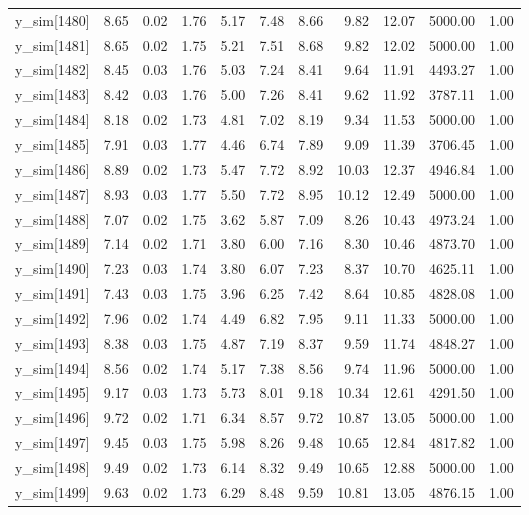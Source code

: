 \begin{table}[ht]
\begin{tabular}{rrrrrrrrrrr}
  y\_sim[1480] & 8.65 & 0.02 & 1.76 & 5.17 & 7.48 & 8.66 & 9.82 & 12.07 & 5000.00 & 1.00 \\ 
  y\_sim[1481] & 8.65 & 0.02 & 1.75 & 5.21 & 7.51 & 8.68 & 9.82 & 12.02 & 5000.00 & 1.00 \\ 
  y\_sim[1482] & 8.45 & 0.03 & 1.76 & 5.03 & 7.24 & 8.41 & 9.64 & 11.91 & 4493.27 & 1.00 \\ 
  y\_sim[1483] & 8.42 & 0.03 & 1.76 & 5.00 & 7.26 & 8.41 & 9.62 & 11.92 & 3787.11 & 1.00 \\ 
  y\_sim[1484] & 8.18 & 0.02 & 1.73 & 4.81 & 7.02 & 8.19 & 9.34 & 11.53 & 5000.00 & 1.00 \\ 
  y\_sim[1485] & 7.91 & 0.03 & 1.77 & 4.46 & 6.74 & 7.89 & 9.09 & 11.39 & 3706.45 & 1.00 \\ 
  y\_sim[1486] & 8.89 & 0.02 & 1.73 & 5.47 & 7.72 & 8.92 & 10.03 & 12.37 & 4946.84 & 1.00 \\ 
  y\_sim[1487] & 8.93 & 0.03 & 1.77 & 5.50 & 7.72 & 8.95 & 10.12 & 12.49 & 5000.00 & 1.00 \\ 
  y\_sim[1488] & 7.07 & 0.02 & 1.75 & 3.62 & 5.87 & 7.09 & 8.26 & 10.43 & 4973.24 & 1.00 \\ 
  y\_sim[1489] & 7.14 & 0.02 & 1.71 & 3.80 & 6.00 & 7.16 & 8.30 & 10.46 & 4873.70 & 1.00 \\ 
  y\_sim[1490] & 7.23 & 0.03 & 1.74 & 3.80 & 6.07 & 7.23 & 8.37 & 10.70 & 4625.11 & 1.00 \\ 
  y\_sim[1491] & 7.43 & 0.03 & 1.75 & 3.96 & 6.25 & 7.42 & 8.64 & 10.85 & 4828.08 & 1.00 \\ 
  y\_sim[1492] & 7.96 & 0.02 & 1.74 & 4.49 & 6.82 & 7.95 & 9.11 & 11.33 & 5000.00 & 1.00 \\ 
  y\_sim[1493] & 8.38 & 0.03 & 1.75 & 4.87 & 7.19 & 8.37 & 9.59 & 11.74 & 4848.27 & 1.00 \\ 
  y\_sim[1494] & 8.56 & 0.02 & 1.74 & 5.17 & 7.38 & 8.56 & 9.74 & 11.96 & 5000.00 & 1.00 \\ 
  y\_sim[1495] & 9.17 & 0.03 & 1.73 & 5.73 & 8.01 & 9.18 & 10.34 & 12.61 & 4291.50 & 1.00 \\ 
  y\_sim[1496] & 9.72 & 0.02 & 1.71 & 6.34 & 8.57 & 9.72 & 10.87 & 13.05 & 5000.00 & 1.00 \\ 
  y\_sim[1497] & 9.45 & 0.03 & 1.75 & 5.98 & 8.26 & 9.48 & 10.65 & 12.84 & 4817.82 & 1.00 \\ 
  y\_sim[1498] & 9.49 & 0.02 & 1.73 & 6.14 & 8.32 & 9.49 & 10.65 & 12.88 & 5000.00 & 1.00 \\ 
  y\_sim[1499] & 9.63 & 0.02 & 1.73 & 6.29 & 8.48 & 9.59 & 10.81 & 13.05 & 4876.15 & 1.00 \\ 

\end{tabular}
\end{table}

